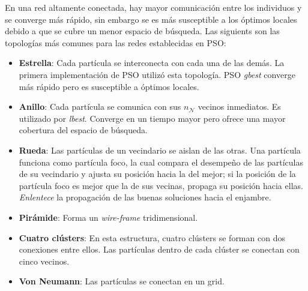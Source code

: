 \documentclass{article}
\begin{document}
En una red altamente conectada, hay mayor comunicación entre los individuos y se converge más rápido, sin embargo se es más susceptible a los óptimos locales debido a que se cubre un menor espacio de búsqueda.
Las siguients son las topologías más comunes para las redes establecidas en PSO:
\begin{itemize}
	\item \textbf{Estrella}: Cada partícula se interconecta con cada una de las demás.
	La primera implementación de PSO utilizó esta topología.
	PSO \emph{gbest} converge más rápido pero es susceptible a óptimos locales.
	\item \textbf{Anillo}: Cada partícula se comunica con sus $n_\mathcal{N}$ vecinos inmediatos.
	Es utilizado por \emph{lbest}. Converge en un tiempo mayor pero ofrece una mayor cobertura del espacio de búsqueda.
	\item \textbf{Rueda}: Las partículas de un vecindario se aislan de las otras.
	Una partícula funciona como partícula foco, la cual compara el desempeño de las partículas de su vecindario y ajusta su posición hacia la del mejor; si la posición de la partícula foco es mejor que la de sus vecinas, propaga su posición hacia ellas.
	\emph{Enlentece} la propagación de las buenas soluciones hacia el enjambre.
	\item \textbf{Pirámide}: Forma un \emph{wire-frame} tridimensional.
	\item \textbf{Cuatro clústers}: En esta estructura, cuatro clústers se forman con dos conexiones entre ellos.
	Las partículas dentro de cada clúster se conectan con cinco vecinos.
	\item \textbf{Von Neumann}: Las partículas se conectan en un grid.
\end{itemize}



\nocite{*}

 
\end{document}
